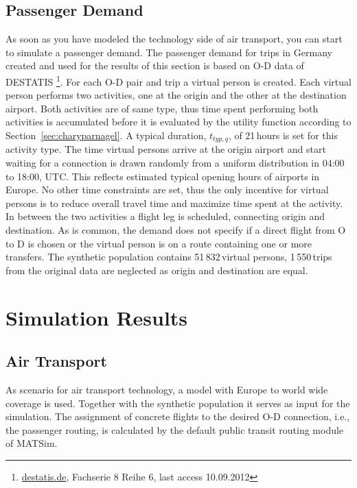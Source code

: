 \subsection{Passenger Demand}
As soon as you have modeled the technology side of air transport, you can start to simulate a passenger demand. 
The passenger demand for trips in Germany created and used for the results of this section is based on O-D data of DESTATIS 
\footnote{\url{destatis.de}, Fachserie 8 Reihe 6, last access 10.09.2012}. 
For each O-D pair and trip a virtual person is created.
Each virtual person performs two activities, one at the origin and the other at the destination airport. 
Both activities are of same type, thus time spent performing both activities is accumulated before it is evaluated by the utility function according to Section~\ref{sec:charyparnagel}. %
A typical duration, $t_{typ,q}$, of 21\,hours is set for this activity type. 
The time virtual persons arrive at the origin airport and start waiting for a connection is drawn randomly from a uniform distribution in 04:00 to 18:00, UTC. 
This reflects estimated typical opening hours of airports in Europe.
No other time constraints are set, thus the only incentive for virtual persons is to reduce overall travel time and maximize time spent at the activity. 
In between the two activities a flight leg is scheduled, connecting origin and destination.
As is common, the demand does not specify if a direct flight from O to D is chosen or the virtual person is on a route containing one or more transfers.
The synthetic population contains 51\,832\,virtual persons, 1\,550\,trips from the original data are neglected as origin and destination are equal. 
%

\section{Simulation Results}
\label{sec:air_rail_results}
\subsection{Air Transport}
As scenario for air transport technology, a model with Europe to world wide coverage is used. 
Together with the synthetic population it serves as input for the simulation.
The assignment of concrete flights to the desired O-D connection, i.e.,\,the passenger routing, is calculated by the default public transit routing module of MATSim.

